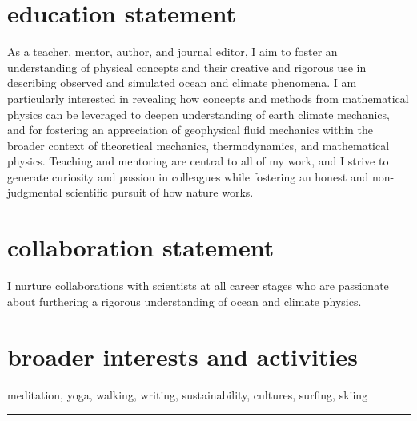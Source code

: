 \documentclass{article}
\begin{document}
\vspace{-.5cm}
\section*{\sc \color{Maroon} education statement}
\vspace{-.3cm}
As a teacher, mentor, author, and journal editor, I aim to foster an understanding of physical concepts and their creative and rigorous use in describing observed and simulated ocean and climate phenomena. I am particularly interested in revealing how concepts and methods from mathematical physics can be leveraged to deepen understanding of earth climate mechanics, and for fostering an appreciation of geophysical fluid mechanics within the broader context of theoretical mechanics, thermodynamics, and mathematical physics. Teaching and mentoring are central to all of my work, and I strive to generate curiosity and passion in colleagues while fostering an honest and non-judgmental scientific pursuit of how nature works. 

\vspace{-.5cm}
\section*{\sc  \color{Maroon}  collaboration statement}
\vspace{-.3cm}
I nurture collaborations with scientists at all career stages who are passionate about furthering a rigorous understanding of ocean and climate physics. 

\vspace{-.5cm}
\section*{\sc  \color{Maroon}  broader interests and activities}
\vspace{-.3cm}
meditation, yoga, walking, writing, sustainability, cultures, surfing, skiing

\noindent\rule{\textwidth}{1pt}


\vspace{-.2cm}
\end{document}
